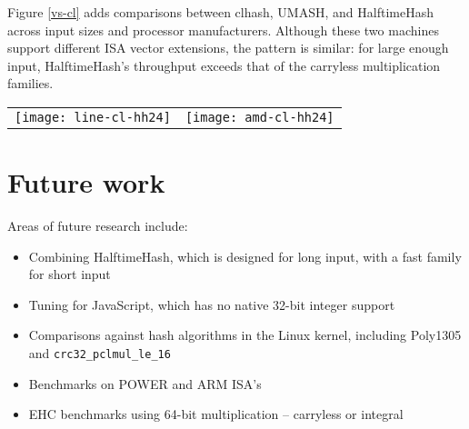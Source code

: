 \documentclass{llncs}
\begin{document}
Figure \ref{vs-cl} adds comparisons between clhash, UMASH, and HalftimeHash across input sizes and processor manufacturers.
Although these two machines support different ISA vector extensions, the pattern is similar: for large enough input, HalftimeHash's throughput exceeds that of the carryless multiplication families.
\begin{figure*}
\begin{tabular}{cc}
\texttt{[image: line-cl-hh24]}
&
\texttt{[image: amd-cl-hh24]}
\end{tabular}
\caption{
  \label{vs-cl}
  Comparison of Intel (i7-7800x) and AMD (EC2 c5a.large, 7R32) performance.
  On both chips HalftimeHash24 is faster than clhash and UMASH for long strings.
  The ``v3'' after the name of the AMD HalftimeHash indicates block size: v3 means a 256-bit block size, while v4 (the default) means 512-bit block size.
  AMD chips do not support AVX-512, but still HalftimeHash with 256-bit blocks exceeds the speed of clmul-based hashing methods by up to a factor of 2.
}
\end{figure*}

\section{Future work}

Areas of future research include:

\begin{itemize}
\item Combining HalftimeHash, which is designed for long input, with a fast family for short input
\item Tuning for JavaScript, which has no native 32-bit integer support
\item Comparisons against hash algorithms in the Linux kernel, including Poly1305 and \texttt{crc32\_pclmul\_le\_16}
\item Benchmarks on POWER and ARM ISA's
\item EHC benchmarks using 64-bit multiplication -- carryless or integral
\end{itemize}


\end{document}

